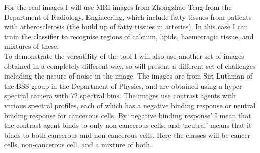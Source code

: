 For the real images I will use MRI images from Zhongzhao Teng from the Department 
of Radiology, Engineering, which include fatty tissues from patients with 
atherosclerosis (the build up of fatty tissues in arteries). In this case I can 
train the classifier to recognise regions of calcium, lipids, haemorragic tissue, 
and mixtures of these. \\

To demonstrate the versatility of the tool I will also use another set of images 
obtained in a completely different way, so will present a different set of 
challenges including the nature of noise in the image. The images are from Siri 
Luthman of the BSS group in the Department of Physics, and are obtained using a 
hyper-spectral camera with 72 spectral bins. The images use contrast agents with 
various spectral profiles, each of which has a negative binding response or 
neutral binding response for cancerous cells. By `negative binding response' I 
mean that the contrast agent binds to only non-cancerous cells, and `neutral' 
means that it binds to both cancerous and non-cancerous cells. Here the classes 
will be cancer cells, non-cancerous cell, and a mixture of both.













